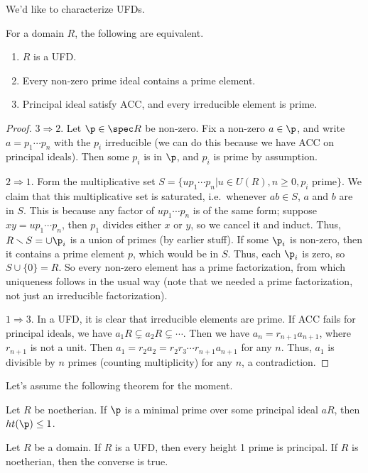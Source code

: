  We'd like to characterize UFDs.
 \begin{theorem}
   For a domain $R$, the following are equivalent.
   \begin{enumerate}
     \item $R$ is a UFD.
     \item Every non-zero prime ideal contains a prime element.
     \item Principal ideal satisfy ACC, and every irreducible element is prime.
   \end{enumerate}
 \end{theorem}
 \begin{proof}
   $3\Rightarrow 2$. Let $\p\in \spec R$ be non-zero. Fix a non-zero $a\in \p$, and write
   $a=p_1\cdots p_n$ with the $p_i$ irreducible (we can do this because we have ACC on
   principal ideals). Then some $p_i$ is in $\p$, and $p_i$ is prime by assumption.

   $2\Rightarrow 1$. Form the multiplicative set $S=\{up_1\cdots p_n|u\in U(R), n\ge 0,
   p_i \text{ prime}\}$. We claim that this multiplicative set is saturated,
   i.e.~whenever $ab\in S$, $a$ and $b$ are in $S$. This is because any factor of
   $up_1\cdots p_n$ is of the same form; suppose $xy=up_1\cdots p_n$, then $p_1$ divides
   either $x$ or $y$, so we cancel it and induct. Thus, $R\smallsetminus S=\cup \p_i$ is
   a union of primes (by earlier stuff). If some $\p_i$ is non-zero, then it contains a
   prime element $p$, which would be in $S$. Thus, each $\p_i$ is zero, so
   $S\cup\{0\}=R$. So every non-zero element has a prime factorization, from which
   uniqueness follows in the usual way (note that we needed a prime factorization, not
   just an irreducible factorization).

   $1\Rightarrow 3$. In a UFD, it is clear that irreducible elements are prime. If ACC
   fails for principal ideals, we have $a_1R\subsetneq a_2R \subsetneq \cdots$. Then we
   have $a_n=r_{n+1} a_{n+1}$, where $r_{n+1}$ is not a unit. Then
   $a_1=r_2a_2=r_2r_3\cdots r_{n+1}a_{n+1}$ for any $n$. Thus, $a_1$ is divisible by $n$
   primes (counting multiplicity) for any $n$, a contradiction.
 \end{proof}
 Let's assume the following theorem for the moment.
 \begin{theorem}
   Let $R$ be noetherian. If $\p$ is a minimal prime over some principal ideal $aR$, then
   $ht(\p)\le 1$.
 \end{theorem}
 \begin{theorem}
   Let $R$ be a domain. If $R$ is a UFD, then every height 1 prime is principal. If $R$
   is noetherian, then the converse is true.
 \end{theorem}
